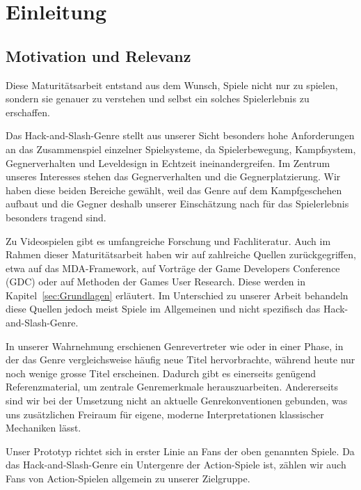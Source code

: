 \documentclass[../Main.tex]{subfiles}
\begin{document}
\section{Einleitung}

\subsection{Motivation und Relevanz}

Diese Maturitätsarbeit entstand aus dem Wunsch, Spiele nicht nur zu spielen, sondern sie genauer zu verstehen und selbst ein solches Spielerlebnis zu erschaffen.

Das Hack-and-Slash-Genre stellt aus unserer Sicht besonders hohe Anforderungen an das Zusammenspiel einzelner Spielsysteme, da Spielerbewegung, Kampfsystem, Gegnerverhalten und Leveldesign in Echtzeit ineinandergreifen. Im Zentrum unseres Interesses stehen das Gegnerverhalten und die Gegnerplatzierung. Wir haben diese beiden Bereiche gewählt, weil das Genre auf dem Kampfgeschehen aufbaut und die Gegner deshalb unserer Einschätzung nach für das Spielerlebnis besonders tragend sind.

Zu Videospielen gibt es umfangreiche Forschung und Fachliteratur. Auch im Rahmen dieser Maturitätsarbeit haben wir auf zahlreiche Quellen zurückgegriffen, etwa auf das MDA-Framework\autocite{hunicke2004mda}, auf Vorträge der Game Developers Conference (GDC) oder auf Methoden der Games User Research\autocite{drachen2018gamesuserresearch}. Diese werden in Kapitel~\ref{sec:Grundlagen} erläutert. Im Unterschied zu unserer Arbeit behandeln diese Quellen jedoch meist Spiele im Allgemeinen und nicht spezifisch das Hack-and-Slash-Genre.

In unserer Wahrnehmung erschienen Genrevertreter wie  oder  in einer Phase, in der das Genre vergleichsweise häufig neue Titel hervorbrachte, während heute nur noch wenige grosse Titel erscheinen. Dadurch gibt es einerseits genügend Referenzmaterial, um zentrale Genremerkmale herauszuarbeiten. Andererseits sind wir bei der Umsetzung nicht an aktuelle Genrekonventionen gebunden, was uns zusätzlichen Freiraum für eigene, moderne Interpretationen klassischer Mechaniken lässt.

Unser Prototyp richtet sich in erster Linie an Fans der oben genannten Spiele. Da das Hack-and-Slash-Genre ein Untergenre der Action-Spiele ist, zählen wir auch Fans von Action-Spielen allgemein zu unserer Zielgruppe.
\end{document}
